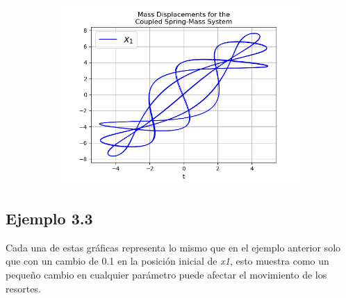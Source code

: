 \documentclass{article}
\begin{document}
\begin{figure}[h!]
\begin{subfigure}[b]{0.5\linewidth}
    \includegraphics[width=\linewidth]{two_springs323.png}
    \caption{}
  \end{subfigure}
\end{figure}

\vspace{5.5cm}

\subsection*{Ejemplo 3.3}

Cada una de estas gráficas representa lo mismo que en el ejemplo anterior solo que con un cambio de 0.1 en la posición inicial de \textit{x1}, esto muestra como un pequeño cambio en cualquier parámetro puede afectar el movimiento de los resortes.
\end{document}
